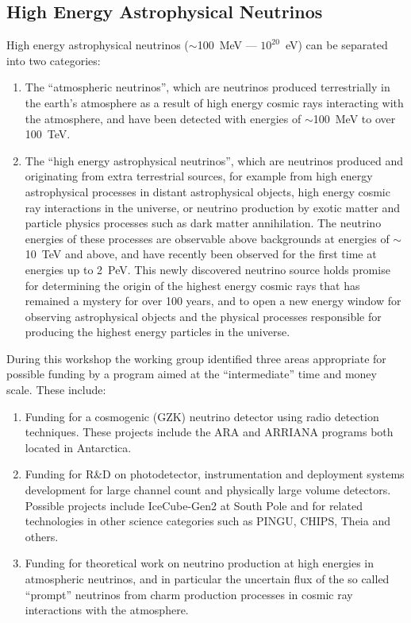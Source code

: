 \subsection{High Energy Astrophysical Neutrinos}
\label{sec:Astrophysical_high}

High energy astrophysical neutrinos ($\sim$100~MeV --- $10^{20}$~eV) can be
separated into two categories: 
\begin{enumerate}
  \item The ``atmospheric neutrinos'', which are neutrinos produced terrestrially in the earth's
atmosphere as a result of high energy cosmic rays interacting with the
atmosphere, and have been detected with energies of $\sim$100~MeV to over
100~TeV. 
   \item The ``high energy astrophysical neutrinos'', which are
neutrinos produced and originating from extra terrestrial sources, for
example from high energy astrophysical processes in distant
astrophysical objects, high energy cosmic ray interactions in the
universe, or neutrino production by exotic matter and particle physics
processes such as dark matter annihilation. The neutrino energies of
these processes are observable above backgrounds at energies of
$\sim$10~TeV and above, and have recently been observed for the first
time at energies up to 2~PeV. This newly discovered neutrino source
holds promise for determining the origin of the highest energy cosmic
rays that has remained a mystery for over 100 years, and to open a new
energy window for observing astrophysical objects and the physical
processes responsible for producing the highest energy particles in
the universe.
\end{enumerate}

During this workshop the working group identified three areas
appropriate for possible funding by a program aimed at the
``intermediate'' time and money scale. These include: 
\begin{enumerate}
  \item Funding for a cosmogenic (GZK) neutrino detector using radio detection
techniques. These projects include the ARA and ARRIANA programs both
located in Antarctica.
  \item Funding for R\&D on photodetector,
instrumentation and deployment systems development for large channel
count and physically large volume detectors. Possible projects include
IceCube-Gen2 at South Pole and for related technologies in other
science categories such as PINGU, CHIPS, Theia and others. 
  \item Funding for theoretical work on neutrino production at high energies in
atmospheric neutrinos, and in particular the uncertain flux of the so
called ``prompt'' neutrinos from charm production processes in
cosmic ray interactions with the atmosphere.
\end{enumerate}



